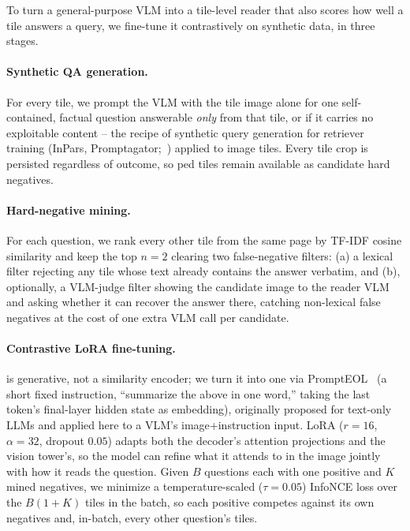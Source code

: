 To turn a general-purpose VLM into a tile-level reader that also scores how well a tile answers a query, we fine-tune it contrastively on synthetic data, in three stages.

\paragraph{Synthetic QA generation.} For every tile, we prompt the VLM with the tile image alone for one self-contained, factual question answerable \emph{only} from that tile, or  if it carries no exploitable content -- the recipe of synthetic query generation for retriever training (InPars, Promptagator;~\citealp{inpars2022,promptagator2022}) applied to image tiles. Every tile crop is persisted regardless of outcome, so ped tiles remain available as candidate hard negatives.

\paragraph{Hard-negative mining.} For each question, we rank every other tile from the same page by TF-IDF cosine similarity and keep the top $n{=}2$ clearing two false-negative filters: (a) a lexical filter rejecting any tile whose text already contains the answer verbatim, and (b), optionally, a VLM-judge filter showing the candidate image to the reader VLM and asking whether it can recover the answer there, catching non-lexical false negatives at the cost of one extra VLM call per candidate.

\paragraph{Contrastive LoRA fine-tuning.}  is generative, not a similarity encoder; we turn it into one via PromptEOL~\citep{prompteol2024} (a short fixed instruction, ``summarize the above in one word,'' taking the last token's final-layer hidden state as embedding), originally proposed for text-only LLMs and applied here to a VLM's image+instruction input. LoRA ($r{=}16$, $\alpha{=}32$, dropout $0.05$) adapts both the decoder's attention projections and the vision tower's, so the model can refine what it attends to in the image jointly with how it reads the question. Given $B$ questions each with one positive and $K$ mined negatives, we minimize a temperature-scaled ($\tau{=}0.05$) InfoNCE loss over the $B(1{+}K)$ tiles in the batch, so each positive competes against its own negatives and, in-batch, every other question's tiles.

